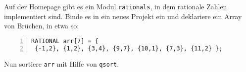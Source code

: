 \begin{aufg} Auf der Homepage gibt es ein Modul \verb|rationals|, in dem rationale Zahlen implementiert sind. Binde es in ein neues Projekt ein und deklariere ein Array von Brüchen, in etwa so:
\begin{codelisting}
\begin{lstlisting}[numbers=left,numberstyle=\tiny,frame=tlrb]
RATIONAL arr[7] = { 
 {-1,2}, {1,2}, {3,4}, {9,7}, {10,1}, {7,3}, {11,2} };
\end{lstlisting}
\end{codelisting}
Nun sortiere \verb|arr| mit Hilfe von \verb|qsort|.
\end{aufg}
